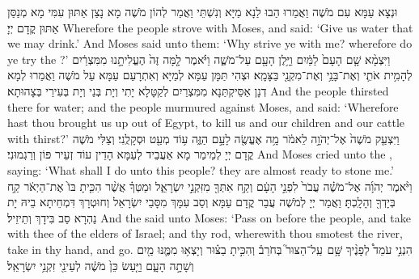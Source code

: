 {וּנְצָא עַמָּא עִם מֹשֶׁה וַאֲמַרוּ הַבוּ לַנָא מַיָּא וְנִשְׁתֵּי וַאֲמַר לְהוֹן מֹשֶׁה מָא נָצַן אַתּוּן עִמִּי מָא מְנַסַּן אַתּוּן קֳדָם יְיָ׃}
{Wherefore the people strove with Moses, and said: ‘Give us water that we may drink.’ And Moses said unto them: ‘Why strive ye with me? wherefore do ye try the \lord?’}{}
{וַיִּצְמָ֨א שָׁ֤ם הָעָם֙ לַמַּ֔יִם וַיָּ֥לֶן הָעָ֖ם עַל־מֹשֶׁ֑ה וַיֹּ֗אמֶר לָ֤מָּה זֶּה֙ הֶעֱלִיתָ֣נוּ מִמִּצְרַ֔יִם לְהָמִ֥ית אֹתִ֛י וְאֶת־בָּנַ֥י וְאֶת־מִקְנַ֖י בַּצָּמָֽא׃}
{וּצְהִי תַּמָּן עַמָּא לְמַיָּא וְאִתְרָעַם עַמָּא עַל מֹשֶׁה וַאֲמַרוּ לְמָא דְנָן אַסֵּיקְתַּנָא מִמִּצְרַיִם לְקַטָּלָא יָתִי וְיָת בְּנַי וְיָת בְּעִירַי בְּצָהוּתָא׃}
{And the people thirsted there for water; and the people murmured against Moses, and said: ‘Wherefore hast thou brought us up out of Egypt, to kill us and our children and our cattle with thirst?’}{}
{וַיִּצְעַ֤ק מֹשֶׁה֙ אֶל־יְהֹוָ֣ה לֵאמֹ֔ר מָ֥ה אֶעֱשֶׂ֖ה לָעָ֣ם הַזֶּ֑ה ע֥וֹד מְעַ֖ט וּסְקָלֻֽנִי׃
}
{וְצַלִּי מֹשֶׁה קֳדָם יְיָ לְמֵימַר מָא אַעֲבֵיד לְעַמָּא הָדֵין עוֹד זְעֵיר פּוֹן וְרַגְמוּנִי׃}
{And Moses cried unto the \lord, saying: ‘What shall I do unto this people? they are almost ready to stone me.’}{}
{וַיֹּ֨אמֶר יְהֹוָ֜ה אֶל־מֹשֶׁ֗ה עֲבֹר֙ לִפְנֵ֣י הָעָ֔ם וְקַ֥ח אִתְּךָ֖ מִזִּקְנֵ֣י יִשְׂרָאֵ֑ל וּמַטְּךָ֗ אֲשֶׁ֨ר הִכִּ֤יתָ בּוֹ֙ אֶת־הַיְאֹ֔ר קַ֥ח בְּיָדְךָ֖ וְהָלָֽכְתָּ׃
}
{וַאֲמַר יְיָ לְמֹשֶׁה עֲבַר קֳדָם עַמָּא וְסַב עִמָּךְ מִסָּבֵי יִשְׂרָאֵל וְחוּטְרָךְ דִּמְחֵיתָא בֵיהּ יָת נַהְרָא סַב בִּידָךְ וְתֵיזֵיל׃}
{And the \lord\space said unto Moses: ‘Pass on before the people, and take with thee of the elders of Israel; and thy rod, wherewith thou smotest the river, take in thy hand, and go.}{}
{הִנְנִ֣י עֹמֵד֩ לְפָנֶ֨יךָ שָּׁ֥ם \pasek  עַֽל־הַצּוּר֮ בְּחֹרֵב֒ וְהִכִּ֣יתָ בַצּ֗וּר וְיָצְא֥וּ מִמֶּ֛נּוּ מַ֖יִם וְשָׁתָ֣ה הָעָ֑ם וַיַּ֤עַשׂ כֵּן֙ מֹשֶׁ֔ה לְעֵינֵ֖י זִקְנֵ֥י יִשְׂרָאֵֽל׃
}
